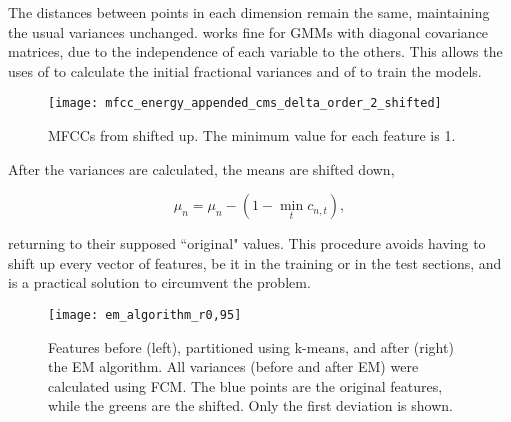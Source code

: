 \noindent The distances between points in each dimension remain the same, maintaining the usual variances unchanged.  works fine for GMMs with diagonal covariance matrices, due to the independence of each variable to the others. This allows the uses of  to calculate the initial fractional variances and of  to train the models.

\begin{figure}[ht]
    \centering
    \texttt{[image: mfcc\_energy\_appended\_cms\_delta\_order\_2\_shifted]}
    \caption{MFCCs from  shifted up. The minimum value for each feature is 1.}
    \label{fig:mfcc-shifted}
\end{figure}

\noindent After the variances are calculated, the means are shifted down,

\begin{equation}
    \mu_n = \mu_n - (1 - \min_t c_{n,t}),
    \label{eq:means-shift-down}
\end{equation}

\noindent returning to their supposed ``original" values. This procedure avoids having to shift up every vector of features, be it in the training or in the test sections, and is a practical solution to circumvent the problem.

\begin{figure}[ht]
    \centering
    \texttt{[image: em\_algorithm\_r0,95]}
    \caption{Features before (left), partitioned using k-means, and after (right) the EM algorithm. All variances (before and after EM) were calculated using FCM. The blue points are the original features, while the greens are the shifted. Only the first deviation is shown.}
    \label{fig:frac-em_algorithm}
\end{figure}